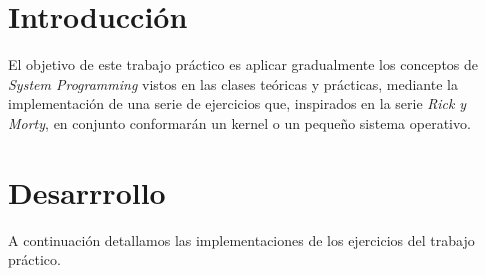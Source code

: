 \documentclass[a4paper]{article}
\begin{document}
\thispagestyle{empty}

\maketitle


\thispagestyle{empty}
\vfill


\thispagestyle{empty}
\vspace{3cm}
\tableofcontents
\newpage


\newpage

\section{Introducción}
\justify
El objetivo de este trabajo práctico es aplicar gradualmente los conceptos de \textit{System Programming} vistos en las clases teóricas y prácticas, mediante la implementación de una serie de ejercicios que, inspirados en la serie \textit{Rick y Morty}, en conjunto conformarán un kernel o un pequeño sistema operativo. 



\section{Desarrrollo}
\justify
A continuación detallamos las implementaciones de los ejercicios del trabajo práctico.
\end{document}
